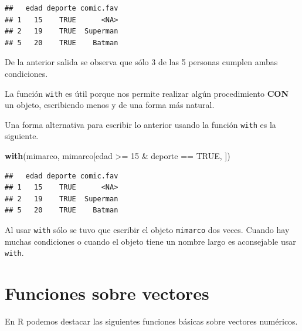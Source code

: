 \documentclass[10pt,]{krantz}
\makeatletter
\newenvironment{Shaded}{\begin{snugshade}}{\end{snugshade}}
\newcommand{\KeywordTok}[1]{\textcolor[rgb]{0.13,0.29,0.53}{\textbf{{#1}}}}
\newcommand{\DecValTok}[1]{\textcolor[rgb]{0.00,0.00,0.81}{{#1}}}
\newcommand{\StringTok}[1]{\textcolor[rgb]{0.31,0.60,0.02}{{#1}}}
\newcommand{\OtherTok}[1]{\textcolor[rgb]{0.56,0.35,0.01}{{#1}}}
\newcommand{\NormalTok}[1]{{#1}}
\let\proglang=\textsf
\newenvironment{kframe}{%
\medskip{}
\setlength{\fboxsep}{.8em}
 \def\at@end@of@kframe{}%
 \ifinner\ifhmode%
  \def\at@end@of@kframe{\end{minipage}}%
  \begin{minipage}{\columnwidth}%
 \fi\fi%
 \def\FrameCommand##1{\hskip\@totalleftmargin \hskip-\fboxsep
 \colorbox{shadecolor}{##1}\hskip-\fboxsep
     \hskip-\linewidth \hskip-\@totalleftmargin \hskip\columnwidth}%
 \MakeFramed {\advance\hsize-\width
   \@totalleftmargin\z@ \linewidth\hsize
   \@setminipage}}%
 {\par\unskip\endMakeFramed%
 \at@end@of@kframe}
\renewenvironment{Shaded}{\begin{kframe}}{\end{kframe}}
\let\BeginKnitrBlock\begin \let\EndKnitrBlock\end
\makeatother
\begin{document}
\begin{Shaded}
\end{Shaded}

\begin{verbatim}
##   edad deporte comic.fav
## 1   15    TRUE      <NA>
## 2   19    TRUE  Superman
## 5   20    TRUE    Batman
\end{verbatim}

De la anterior salida se observa que sólo 3 de las 5 personas cumplen
ambas condiciones.

 \BeginKnitrBlock{rmdtip}

La función \texttt{with} es útil porque nos permite realizar algún
procedimiento \textbf{CON} un objeto, escribiendo menos y de una forma
más natural.
\EndKnitrBlock{rmdtip}

Una forma alternativa para escribir lo anterior usando la función
\texttt{with} es la siguiente.

\begin{Shaded}
\begin{Highlighting}[]
\KeywordTok{with}\NormalTok{(mimarco, mimarco[edad >=}\StringTok{ }\DecValTok{15} \NormalTok{&}\StringTok{ }\NormalTok{deporte ==}\StringTok{ }\OtherTok{TRUE}\NormalTok{, ])}
\end{Highlighting}
\end{Shaded}

\begin{verbatim}
##   edad deporte comic.fav
## 1   15    TRUE      <NA>
## 2   19    TRUE  Superman
## 5   20    TRUE    Batman
\end{verbatim}

Al usar \texttt{with} sólo se tuvo que escribir el objeto
\texttt{mimarco} dos veces. Cuando hay muchas condiciones o cuando el
objeto tiene un nombre largo es aconsejable usar \texttt{with}.

\section{Funciones sobre vectores}\label{funciones-sobre-vectores}

En \proglang{R} podemos destacar las siguientes funciones básicas sobre
vectores numéricos.
\end{document}
